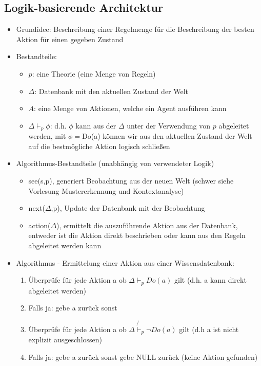 \documentclass{article} %
\begin{document}
	\subsection{Logik-basierende Architektur}
	\begin{itemize}
		\item Grundidee: Beschreibung einer Regelmenge für die Beschreibung der besten Aktion für einen gegeben Zustand
		\item Bestandteile:
		\begin{itemize}
			\item $p$: eine Theorie (eine Menge von Regeln)
			\item $\Delta$: Datenbank mit den aktuellen Zustand der Welt
			\item $A$: eine Menge von Aktionen, welche ein Agent ausführen kann
			\item $\Delta\vdash_{p}\phi$: d.h. $\phi$ kann aus der $\Delta$ unter der Verwendung von $p$ abgeleitet werden, mit $\phi=$Do(a) können wir aus den aktuellen Zustand der Welt auf die bestmögliche Aktion logisch schließen
		\end{itemize}
		 \item Algorithmus-Bestandteile (unabhängig von verwendeter Logik)
		 \begin{itemize}
		 	\item see(s,p), generiert Beobachtung aus der neuen Welt (schwer siehe Vorlesung Mustererkennung und Kontextanalyse)
		 	\item next($\Delta$,p), Update der Datenbank mit der Beobachtung
		 	\item action($\Delta$), ermittelt die auszuführende Aktion aus der Datenbank, entweder ist die Aktion direkt beschrieben oder kann aus den Regeln abgeleitet werden kann
		 \end{itemize}
		 \item Algorithmus - Ermittelung einer Aktion aus einer Wissensdatenbank:
		 \begin{enumerate}
		 	\item Überprüfe für jede Aktion a ob  $\Delta\vdash_{p}Do(a)$ gilt (d.h. a kann direkt abgeleitet werden)
		 	\item Falls ja: gebe a zurück sonst
		 	\item Überprüfe für jede Aktion a ob $\Delta\not{\vdash}_{p}\neg Do(a)$ gilt (d.h a ist nicht explizit ausgeschlossen)
		 	\item Falls ja: gebe a zurück sonst gebe NULL zurück (keine Aktion gefunden)
		 \end{enumerate}
	\end{itemize}
\end{document}
